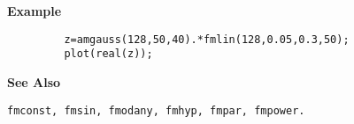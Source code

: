 {\bf \large {}\selectfont Example}
\begin{verbatim}
         z=amgauss(128,50,40).*fmlin(128,0.05,0.3,50); 
         plot(real(z));
\end{verbatim}
\vspace*{.5cm}


{\bf \large {}\selectfont See Also}\\
\hspace*{1.5cm}
\begin{minipage}[t]{13.5cm}
\begin{verbatim}
fmconst, fmsin, fmodany, fmhyp, fmpar, fmpower.
\end{verbatim}
\end{minipage}

